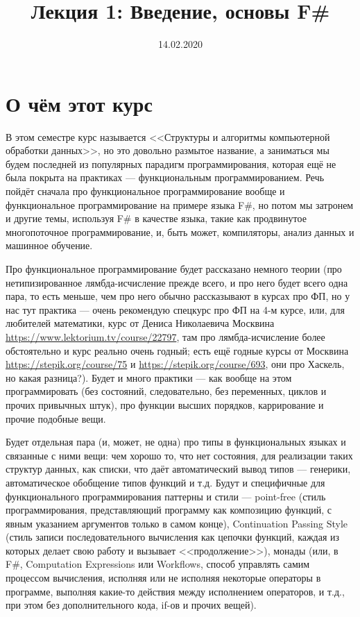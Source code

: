 \documentclass[a5paper]{article}
\title{Лекция 1: Введение, основы F\#}
\date{14.02.2020}
\begin{document}
\maketitle
\thispagestyle{empty}

\section{О чём этот курс}

В этом семестре курс называется <<Структуры и алгоритмы компьютерной обработки данных>>, но это довольно размытое название, а заниматься мы будем последней из популярных парадигм программирования, которая ещё не была покрыта на практиках --- функциональным программированием. Речь пойдёт сначала про функциональное программирование вообще и функциональное программирование на примере языка F\#, но потом мы затронем и другие темы, используя F\# в качестве языка, такие как продвинутое многопоточное программирование, и, быть может, компиляторы,  анализ данных и машинное обучение.

Про функциональное программирование будет рассказано немного теории (про нетипизированное лямбда-исчисление прежде всего, и про него будет всего одна пара, то есть меньше, чем про него обычно рассказывают в курсах про ФП, но у нас тут практика --- очень рекомендую спецкурс про ФП на 4-м курсе, или, для любителей математики, курс от Дениса Николаевича Москвина \url{https://www.lektorium.tv/course/22797}, там про лямбда-исчисление более обстоятельно и курс реально очень годный; есть ещё годные курсы от Москвина \url{https://stepik.org/course/75} и \url{https://stepik.org/course/693}, они про Хаскель, но какая разница?). Будет и много практики --- как вообще на этом программировать (без состояний, следовательно, без переменных, циклов и прочих привычных штук), про функции высших порядков, каррирование и прочие подобные вещи.

Будет отдельная пара (и, может, не одна) про типы в функциональных языках и связанные с ними вещи: чем хорошо то, что нет состояния, для реализации таких структур данных, как списки, что даёт автоматический вывод типов --- генерики, автоматическое обобщение типов функций и т.д. Будут и специфичные для функционального программирования паттерны и стили --- point-free (стиль программирования, представляющий программу как композицию функций, с явным указанием аргументов только в самом конце), Continuation Passing Style (стиль записи последовательного вычисления как цепочки функций, каждая из которых делает свою работу и вызывает <<продолжение>>), монады (или, в F\#, Computation Expressions или Workflows, способ управлять самим процессом вычисления, исполняя или не исполняя некоторые операторы в программе, выполняя какие-то действия между исполнением операторов, и т.д., при этом без дополнительного кода, if-ов и прочих вещей).
\end{document}
